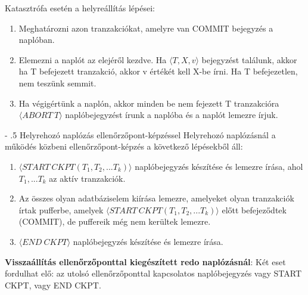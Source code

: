\documentclass[margin=0px]{article}
\makeatletter
\renewcommand\paragraph{%
	\@startsection{paragraph}{4}{0mm}%
	{-\baselineskip}%
	{.5\baselineskip}%
	{\normalfont\normalsize\bfseries}}
\makeatother
\begin{document}
	\noindent Katasztrófa esetén a helyreállítás lépései:
	\begin{enumerate}
		\item	Meghatározni azon tranzakciókat, amelyre van COMMIT bejegyzés a naplóban.
		\item	Elemezni a naplót az elejéről kezdve. Ha $\langle T,X,v\rangle$ bejegyzést találunk, akkor
		ha T befejezett tranzakció, akkor v értékét kell X-be írni. Ha T befejezetlen, nem teszünk semmit.
		\item	Ha végigértünk a naplón, akkor minden be nem fejezett T tranzakcióra $\langle ABORT \ T\rangle$
		naplóbejegyzést írunk a naplóba és a naplót lemezre írjuk.
	\end{enumerate}
	
	\paragraph{Helyrehozó naplózás ellenőrzőpont-képzéssel}
	Helyrehozó naplózásnál a működés közbeni ellenőrzőpont-képzés a következő lépésekből áll:
	\begin{enumerate}
		\item	$\langle START \ CKPT(T_{1},T_{2},...T_{k}) \rangle$ naplóbejegyzés készítése és lemezre írása, ahol
		$T_{1}, ... T_{k}$ az aktív tranzakciók.
		
		\item	Az összes olyan adatbáziselem kiírása lemezre, amelyeket olyan tranzakciók írtak pufferbe, amelyek
		$\langle START \ CKPT(T_{1},T_{2},...T_{k}) \rangle$ előtt befejeződtek (COMMIT), de puffereik még nem kerültek
		lemezre.
		
		\item	$\langle END \ CKPT \rangle$ naplóbejegyzés készítése és lemezre írása.	
	\end{enumerate}
	
	\noindent \textbf{Visszaállítás ellenőrzőponttal kiegészített redo naplózásnál}:
	Két eset fordulhat elő: az utolsó ellenőrzőponttal kapcsolatos naplóbejegyzés vagy START CKPT, vagy END CKPT.
	
\end{document}
